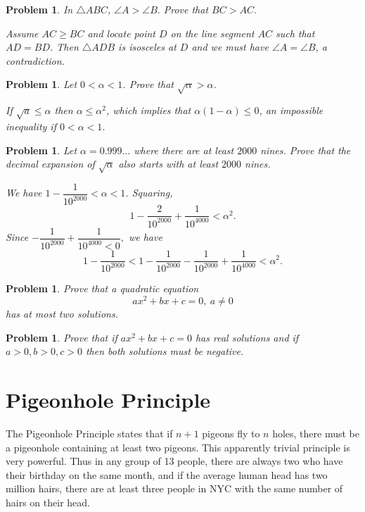 \documentclass[11pt, openany]{book}
\theoremstyle{change} \theoremheaderfont{\blue\sffamily\bfseries}
\newtheorem{pro}[thm]{Problem}
\theoremstyle{nonumberplain} \theoremheaderfont{\sffamily\bfseries}
\newcommand{\í}{\'{\i}}
\begin{document}
\begin{pro}
In $\triangle ABC$, $\angle A > \angle B.$ Prove that $BC > AC.$
\begin{answer}
Assume $AC \geq BC$ and locate point $D$ on  the line segment $AC$
such that $AD = BD$. Then $\triangle ADB$ is isosceles at $D$ and we
must have $\angle A = \angle B$, a contradiction.
\end{answer}
\end{pro}
\begin{pro}
Let $0 < \alpha < 1$. Prove that $\sqrt{\alpha} > \alpha$.
\begin{answer}
If $\sqrt{a} \leq \alpha$ then $\alpha \leq \alpha^2$, which implies
that $\alpha (1 - \alpha) \leq 0$, an impossible inequality if $0 <
\alpha < 1$.
\end{answer}
\end{pro}
\begin{pro}
Let $\alpha = 0.999\ldots$ where there are at least $2000$ nines.
Prove that the decimal expansion of $\sqrt{\alpha}$ also starts
with at least $2000$ nines.
\begin{answer}
We have $1 - \dfrac{1}{10^{2000}}<\alpha <1$. Squaring, $$1 -
\dfrac{2}{10^{2000}} + \dfrac{1}{10^{4000}} < \alpha^2. $$Since $-
\dfrac{1}{10^{2000}} + \dfrac{1}{10^{4000}< 0},$ we have $$1 -
\dfrac{1}{10^{2000}} < 1 - \dfrac{1}{10^{2000}} -
\dfrac{1}{10^{2000}} + \dfrac{1}{10^{4000}} < \alpha^2.$$
\end{answer}
\end{pro}
\begin{pro}
Prove that a quadratic equation $$ax^2 + bx + c = 0, \ a \neq  0$$
has at most two solutions.
\end{pro}
\begin{pro}
Prove that if $ax^2 + bx + c = 0$ has real solutions and if $a >
0, b > 0, c > 0$ then both solutions must be negative.
\end{pro}

\section{Pigeonhole Principle} The Pigeonhole
Principle states that if $n + 1$
pigeons fly to $n$ holes, there must be a pigeonhole containing at
least two pigeons. This apparently trivial principle is very
powerful. Thus in any group of 13 people, there are always two who
have their birthday on the same month, and if the average human
head has two million hairs, there are at least three people in NYC
with the same number of hairs on their head.
\end{document}
